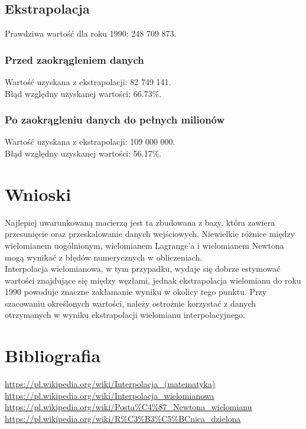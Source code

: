 \documentclass[11pt]{scrartcl}
\begin{document}
    \subsection{Ekstrapolacja}
    Prawdziwa wartość dla roku 1990: 248 709 873.

    \subsubsection*{Przed zaokrągleniem danych}
    Wartość uzyskana z ekstrapolacji: 82 749 141. \\
    Błąd względny uzyskanej wartości: 66.73\%.

    \subsubsection*{Po zaokrągleniu danych do pełnych milionów}
    Wartość uzyskana z ekstrapolacji: 109 000 000. \\
    Błąd względny uzyskanej wartości: 56.17\%.

    \section{Wnioski}
    Najlepiej uwarunkowaną macierzą jest ta zbudowana z bazy, która zawiera
    przesunięcie oraz przeskalowanie danych wejściowych. Niewielkie różnice między
    wielomianem uogólnionym, wielomianem Lagrange'a i wielomianem Newtona mogą
    wynikać z błędów numerycznych w obliczeniach. \\
    Interpolacja wielomianowa, w tym przypadku, wydaje się dobrze estymować wartości
    znajdujące się między węzłami, jednak ekstrapolacja wielomianu do roku 1990
    powoduje znaczne zakłamanie wyniku w okolicy tego punktu. Przy szacowaniu
    określonych wartości, należy ostrożnie korzystać z danych otrzymanych w wyniku
    ekstrapolacji wielomianu interpolacyjnego.

    \section{Bibliografia}
    \url{https://pl.wikipedia.org/wiki/Interpolacja_(matematyka)} \\
    \url{https://pl.wikipedia.org/wiki/Interpolacja_wielomianowa} \\
    \url{https://pl.wikipedia.org/wiki/Posta%C4%87_Newtona_wielomianu} \\
    \url{https://pl.wikipedia.org/wiki/R%C3%B3%C5%BCnica_dzielona}
\end{document}
